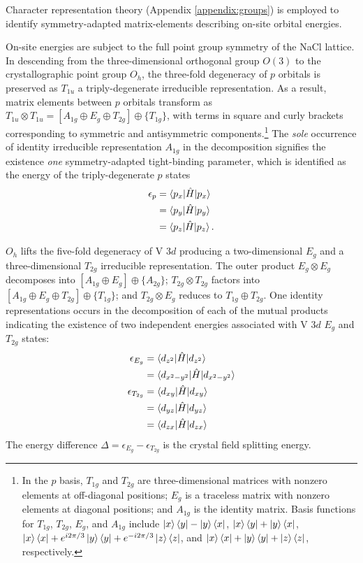 \documentclass[twocolumn,showpacs,preprintnumbers,superscriptaddress,prb,floatfix,aps,10pt]{revtex4-1}
\newcommand*{\ham}{\hat{H}}
\begin{document}
Character representation theory (Appendix \ref{appendix:groups}) is employed to identify symmetry-adapted matrix-elements describing on-site orbital energies. 

On-site energies are subject to the full point group symmetry of the NaCl lattice. In descending from the three-dimensional orthogonal group $O(3)$ to the crystallographic point group $O_h$, the three-fold degeneracy of $p$ orbitals is preserved as $T_{1u}$ a triply-degenerate irreducible representation. As a result, matrix elements between $p$ orbitals transform as $T_{1u} \otimes T_{1u} = [A_{1g} \oplus E_g \oplus T_{2g}] \oplus \{T_{1g}\}$, with terms in square and curly brackets corresponding to symmetric and antisymmetric components.\footnote{In the $p$ basis, $T_{1g}$ and $T_{2g}$ are three-dimensional matrices with nonzero elements at off-diagonal positions; $E_g$ is a traceless matrix with nonzero elements at diagonal positions; and $A_{1g}$ is the identity matrix. Basis functions for $T_{1g}$, $T_{2g}$, $E_g$, and $A_{1g}$ include $\ket{x}\bra{y} - \ket{y}\bra{x}$, $\ket{x}\bra{y} + \ket{y}\bra{x}$, $\ket{x}\bra{x} + e^{i2\pi/3}\ket{y}\bra{y} + e^{-i2\pi/3}\ket{z}\bra{z}$, and $\ket{x}\bra{x} + \ket{y}\bra{y} + \ket{z}\bra{z}$, respectively.} The \emph{sole} occurrence of identity irreducible representation $A_{1g}$ in the decomposition signifies the existence \emph{one} symmetry-adapted tight-binding parameter, which is identified as the energy of the triply-degenerate $p$ states
%
\begin{align}
\epsilon_{p}
&= \braket{p_x | \ham | p_x} \\
&= \braket{p_y | \ham | p_y} \\
&= \braket{p_z | \ham | p_z}.
\end{align}
%

$O_h$ lifts the five-fold degeneracy of V 3$d$ producing a two-dimensional $E_g$ and a three-dimensional $T_{2g}$ irreducible representation. The outer product $E_g \otimes E_g$ decomposes into $[A_{1g} \oplus E_g] \oplus \{A_{2g}\}$; $T_{2g} \otimes T_{2g}$ factors into $[A_{1g} \oplus E_{g} \oplus T_{2g}] \oplus \{T_{1g}\}$; and $T_{2g} \otimes E_g$ reduces to $T_{1g} \oplus T_{2g}$. One identity representations occurs in the decomposition of each of the mutual products indicating the existence of two independent energies associated with V 3$d$ $E_g$ and $T_{2g}$ states:
\begin{align}
\epsilon_{E_g}
&= \braket{d_{z^2}      | \ham | d_{z^2}} \\
&= \braket{d_{x^2-y^2}  | \ham | d_{x^2-y^2}  } \\
\epsilon_{T_{2g}}
&= \braket{d_{xy} | \ham | d_{xy} } \\
&= \braket{d_{yz} | \ham | d_{yz} } \\
&= \braket{d_{zx} | \ham | d_{zx} }
\end{align}
The energy difference $\Delta = \epsilon_{E_g} - \epsilon_{T_{2g}}$ is the crystal field splitting energy. 
\end{document}
